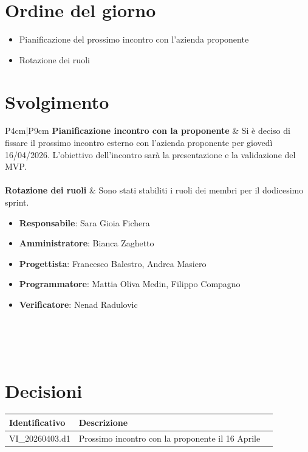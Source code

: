 \documentclass[a4paper,12pt]{article}
\begin{document}


\newpage
\tableofcontents
\newpage

\markright{}

\newpage
\section{Ordine del giorno}

\begin{itemize}
    \item Pianificazione del prossimo incontro con l'azienda proponente
    \item Rotazione dei ruoli
\end{itemize}

\section{Svolgimento}
\begin{longtable}{P{4cm}|P{9cm}}
\textbf{Pianificazione incontro con la proponente} & Si è deciso di fissare il prossimo incontro esterno con l'azienda proponente per giovedì 16/04/2026. L'obiettivo dell'incontro sarà la presentazione e la validazione del MVP.\\
\\
\textbf{Rotazione dei ruoli} & Sono stati stabiliti i ruoli dei membri per il dodicesimo sprint.
            \begin{itemize}
                    \item \textbf{Responsabile}: Sara Gioia Fichera
                \item \textbf{Amministratore}:  Bianca Zaghetto
                \item \textbf{Progettista}: Francesco Balestro, Andrea Masiero
                \item \textbf{Programmatore}: Mattia Oliva Medin, Filippo Compagno
                \item \textbf{Verificatore}: Nenad Radulovic
            \end{itemize}\\\\
\\
\end{longtable}

\section{Decisioni} {
        \begin{tabularx}{\textwidth}{|l|X|l|}
            \hline
            \textbf{Identificativo} & \textbf{Descrizione}\\
            \hline
            VI\_20260403.d1 & Prossimo incontro con la proponente il 16 Aprile\\
            \hline
        \end{tabularx}
    }
\end{document}
